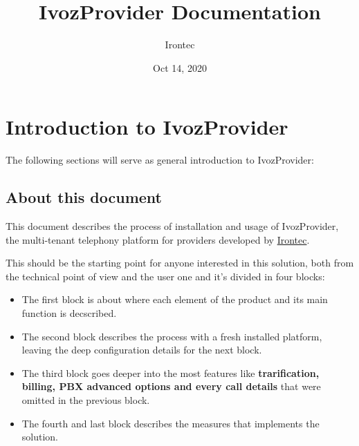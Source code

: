 \documentclass[letterpaper,10pt,english]{sphinxmanual}
\title{IvozProvider Documentation}
\date{Oct 14, 2020}
\author{Irontec}
\begin{document}
\maketitle
\tableofcontents
{}\label{index::doc}



\chapter{Introduction to IvozProvider}
\label{intro/index::doc}\label{intro/index:introduction-to-ivozprovider}\label{intro/index:ivozprovider-official-documentation}
The following sections will serve as general introduction to IvozProvider:


\section{About this document}
\label{intro/about:about-this-document}\label{intro/about::doc}
This document describes the process of installation and usage of
IvozProvider, the multi-tenant telephony platform for providers developed
by \href{http://irontec.com}{Irontec}.

This should be the starting point for anyone interested in this solution,
both  from the technical point of view and the user one and it's divided
in four blocks:
\begin{itemize}
\item {} 
The first block is about {\hyperref[index:concepts]{}} where each element of the
product and its main function is decscribed.

\item {} 
The second block describes the {\hyperref[index:installation]{}} process with a fresh
installed platform, leaving the deep configuration details for the next
block.

\item {} 
The third block goes deeper into the most {\hyperref[index:advanced]{}} features like
\textbf{trarification, billing, PBX advanced options and every call details}
that were omitted in the previous block.

\item {} 
The fourth and last block describes the {\hyperref[index:security]{}} measures that
implements the solution.

\end{itemize}
\end{document}
